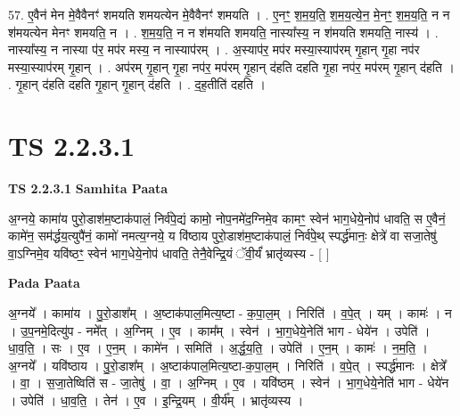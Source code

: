 \documentclass[17pt]{extarticle}
\begin{document}
57. ए॒वैन॑ मेन मे॒वैवैनꣳ॑ शमयति शमयत्येन मे॒वैवैनꣳ॑ शमयति । . ए॒नꣳ॒॒ श॒म॒य॒ति॒ श॒म॒य॒त्ये॒न॒ मे॒नꣳ॒॒ श॒म॒य॒ति॒ न न श॑मयत्येन मेनꣳ शमयति॒ न । . श॒म॒य॒ति॒ न न श॑मयति शमयति॒ नास्या᳚स्य॒ न श॑मयति शमयति॒ नास्य॑ । . नास्या᳚स्य॒ न नास्या प॑र॒ मप॑र मस्य॒ न नास्याप॑रम् । . अ॒स्याप॑र॒ मप॑र मस्या॒स्याप॑रम् गृ॒हान् गृ॒हा नप॑र मस्या॒स्याप॑रम् गृ॒हान् । . अप॑रम् गृ॒हान् गृ॒हा नप॑र॒ मप॑रम् गृ॒हान् द॑हति दहति गृ॒हा नप॑र॒ मप॑रम् गृ॒हान् द॑हति । . गृ॒हान् द॑हति दहति गृ॒हान् गृ॒हान् द॑हति । . द॒ह॒तीति॑ दहति । \newline
\pagebreak
{}
\section*{ TS 2.2.3.1 }

\textbf{TS 2.2.3.1 } \newline
\textbf{Samhita Paata} \newline

अ॒ग्नये॒ कामा॑य पुरो॒डाश॑म॒ष्टाक॑पालं॒ निर्व॑पे॒द्यं कामो॒ नोप॒नमे॑द॒ग्निमे॒व कामꣳ॒॒ स्वेन॑ भाग॒धेये॒नोप॑ धावति॒ स ए॒वैनं॒ कामे॑न॒ सम॑र्द्धय॒त्युपै॑नं॒ कामो॑ नमत्य॒ग्नये॒ य वि॑ष्ठाय पुरो॒डाश॑म॒ष्टाक॑पालं॒ निर्व॑पे॒थ् स्पर्द्ध॑मानः॒ क्षेत्रे॑ वा सजा॒तेषु॑ वा॒ऽग्निमे॒व यवि॑ष्ठꣳ॒॒ स्वेन॑ भाग॒धेये॒नोप॑ धावति॒ तेनै॒वेन्द्रि॒यं ॅवी॒र्यं॑ भ्रातृ॑व्यस्य - [  ] \newline

\textbf{Pada Paata} \newline

अ॒ग्नये᳚ । कामा॑य । पु॒रो॒डाश᳚म् । अ॒ष्टाक॑पाल॒मित्य॒ष्टा - क॒पा॒ल॒म् । निरिति॑ । व॒पे॒त् । यम् । कामः॑ । न । उ॒प॒नमे॒दित्यु॑प - नमे᳚त् । अ॒ग्निम् । ए॒व । काम᳚म् । स्वेन॑ । भा॒ग॒धेये॒नेति॑ भाग - धेये॑न । उपेति॑ । धा॒व॒ति॒ । सः । ए॒व । ए॒न॒म् । कामे॑न । समिति॑ । अ॒र्द्ध॒य॒ति॒ । उपेति॑ । ए॒न॒म् । कामः॑ । न॒म॒ति॒ । अ॒ग्नये᳚ । यवि॑ष्ठाय । पु॒रो॒डाश᳚म् । अ॒ष्टाक॑पाल॒मित्य॒ष्टा-क॒पा॒ल॒म् । निरिति॑ । व॒पे॒त् । स्पर्द्ध॑मानः । क्षेत्रे᳚ । वा॒ । स॒जा॒तेष्विति॑ स - जा॒तेषु॑ । वा॒ । अ॒ग्निम् । ए॒व । यवि॑ष्ठम् । स्वेन॑ । भा॒ग॒धेये॒नेति॑ भाग - धेये॑न । उपेति॑ । धा॒व॒ति॒ । तेन॑ । ए॒व । इ॒न्द्रि॒यम् । वी॒र्य᳚म् । भ्रातृ॑व्यस्य ।  \newline
\end{document}

